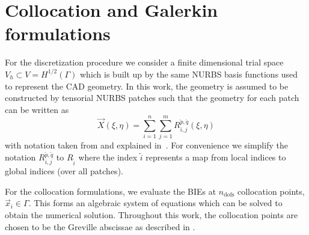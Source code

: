\section{Collocation and Galerkin formulations}
\label{Sec3:BEM}
For the discretization procedure we consider a finite dimensional trial space $V_h\subset V=H^{1/2}(\Gamma)$ which is built up by the same NURBS basis functions used to represent the CAD geometry. In this work, the geometry is assumed to be constructed by tensorial NURBS patches such that the geometry for each patch can be written as
\begin{equation*}
	\vec{X}(\xi,\eta) = \sum_{i=1}^n\sum_{j=1}^m R_{i,j}^{\check{p},\check{q}}(\xi,\eta)
\end{equation*}
with notation taken from and explained in~\cite[p. 51]{Cottrell2006iao}. For convenience we simplify the notation $R_{i,j}^{\check{p},\check{q}}$ to $R_{\tilde{i}}$ where the index $\tilde{i}$ represents a map from local indices to global indices (over all patches).

For the collocation formulations, we evaluate the BIEs at $n_{\mathrm{dofs}}$ collocation points, $\vec{x}_i\in\Gamma$. This forms an algebraic system of equations which can be solved to obtain the numerical solution. Throughout this work, the collocation points are chosen to be the Greville abscissae as described in \cite{Scott2013ibe}. 

